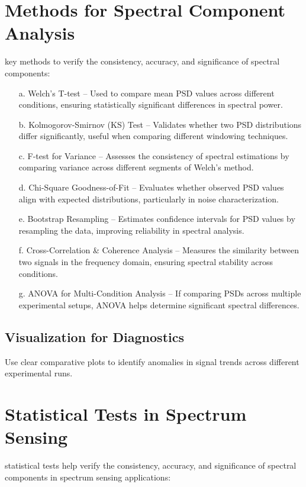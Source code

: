 \documentclass[10pt]{report}
\begin{document}
\section*{Methods for Spectral Component Analysis}

key methods to verify the consistency, accuracy, and significance of spectral components:

\begin{itemize}
 \item[a.] Welch’s T-test – Used to compare mean PSD values across different conditions, ensuring statistically significant differences in spectral power.
 \item[b.] Kolmogorov-Smirnov (KS) Test – Validates whether two PSD distributions differ significantly, useful when comparing different windowing techniques.
 \item[c.] F-test for Variance – Assesses the consistency of spectral estimations by comparing variance across different segments of Welch’s method.
 \item[d.] Chi-Square Goodness-of-Fit – Evaluates whether observed PSD values align with expected distributions, particularly in noise characterization.
 \item[e.] Bootstrap Resampling – Estimates confidence intervals for PSD values by resampling the data, improving reliability in spectral analysis.
 \item[f.] Cross-Correlation \& Coherence Analysis – Measures the similarity between two signals in the frequency domain, ensuring spectral stability across conditions.
 \item[g.] ANOVA for Multi-Condition Analysis – If comparing PSDs across multiple experimental setups, ANOVA helps determine significant spectral differences.
\end{itemize}

\subsection*{Visualization for Diagnostics}

Use clear comparative plots to identify anomalies in signal trends across different experimental runs.

\section*{Statistical Tests in Spectrum Sensing}

statistical tests help verify the consistency, accuracy, and significance of spectral components in spectrum sensing applications:
\end{document}
